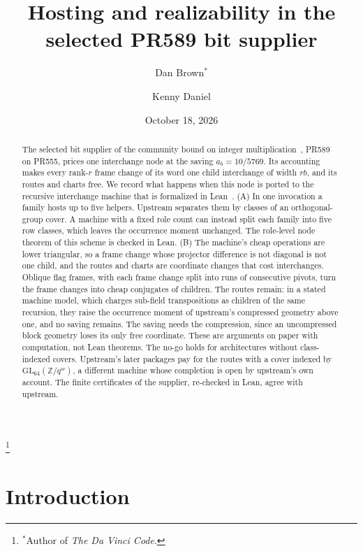 \documentclass[11pt]{amsart}
\begin{document}
\title[PR589 hosting and realizability]{Hosting and realizability in the selected PR589 bit supplier}

\author{Dan Brown$^*$}
\thanks{$^*$Author of \emph{The Da Vinci Code}.}
\author{Kenny Daniel}

\date{October 18, 2026}

\begin{abstract}
The selected bit supplier of the community bound on integer multiplication~\cite{CS}, PR589 on
PR555, prices one interchange node at the saving $a_b = 10/5769$. Its accounting makes every
rank-$r$ frame change of its word one child interchange of width $r b$, and its routes and charts
free. We record what happens when this node is ported to the recursive interchange machine that is
formalized in Lean~\cite{IMB}. (A) In one invocation a family hosts up to five helpers. Upstream
separates them by classes of an orthogonal-group cover. A machine with a fixed role count can
instead split each family into five row classes, which leaves the occurrence moment unchanged. The
role-level node theorem of this scheme is checked in Lean.
(B) The machine's cheap operations are lower triangular, so a frame change whose projector
difference is not diagonal is not one child, and the routes and charts are coordinate changes that
cost interchanges. Oblique flag frames, with each frame change split into runs of consecutive pivots, turn the
frame changes into cheap conjugates of children.
The routes remain: in a stated machine model, which charges sub-field transpositions as children of
the same recursion, they raise the occurrence moment of upstream's compressed geometry above one,
and no saving remains. The saving needs the compression, since an uncompressed block geometry
loses its only free coordinate. These are arguments on paper with computation, not Lean theorems.
The no-go holds for architectures without class-indexed covers. Upstream's later packages pay for
the routes with a cover indexed by $\mathrm{GL}_{64}(\mathbb{Z}/q^w)$, a different machine whose
completion is open by upstream's own account. The finite certificates of the supplier, re-checked in Lean, agree with upstream.
\end{abstract}

\maketitle

\section{Introduction}
\end{document}
